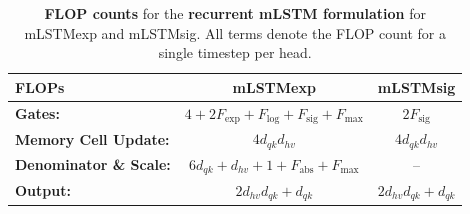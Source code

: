 \documentclass{article}
\begin{document}
    \begin{table}[htbp]
        \vspace{-0.3cm}
        \centering
        \caption{\label{tab:flop_counts_mlstm_recurrent} \textbf{FLOP counts} for the \textbf{recurrent mLSTM formulation} for mLSTMexp and mLSTMsig.
            All terms denote the FLOP count for a single timestep per head.}
        \vspace{0.2cm}
        \begin{tabular}{lcc}
            \toprule
            FLOPs                          & mLSTMexp                                                         & mLSTMsig                   \\
            \midrule
            \textbf{Gates:}                & $4 + 2F_\text{exp} + F_\text{log} + F_\text{sig} + F_\text{max}$ & $2 F_\text{sig}$           \\
            \textbf{Memory Cell Update:}   & $4 d_{qk} d_{hv}$                                                & $4 d_{qk} d_{hv}$          \\
            \textbf{Denominator \& Scale:} & $6 d_{qk} + d_{hv} + 1 + F_\text{abs} + F_\text{max}$            & --                         \\
            \textbf{Output:}               & $2 d_{hv} d_{qk} + d_{qk}$                                       & $2 d_{hv} d_{qk} + d_{qk}$ \\
            \bottomrule
        \end{tabular}
        \vspace{-0.2cm}
    \end{table}
\end{document}
